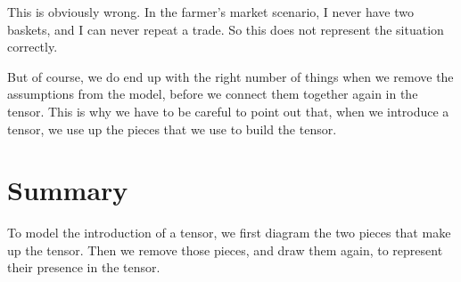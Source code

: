 \documentclass[../../../main.tex]{subfiles}
\begin{document}
This is obviously wrong. In the farmer's market scenario, I never have two baskets, and I can never repeat a trade. So this does not represent the situation correctly.

But of course, we do end up with the right number of things when we remove the assumptions from the model, before we connect them together again in the tensor. This is why we have to be careful to point out that, when we introduce a tensor, we use up the pieces that we use to build the tensor.


\section{Summary}

To model the introduction of a tensor, we first diagram the two pieces that make up the tensor. Then we remove those pieces, and draw them again, to represent their presence in the tensor.
\end{document}
